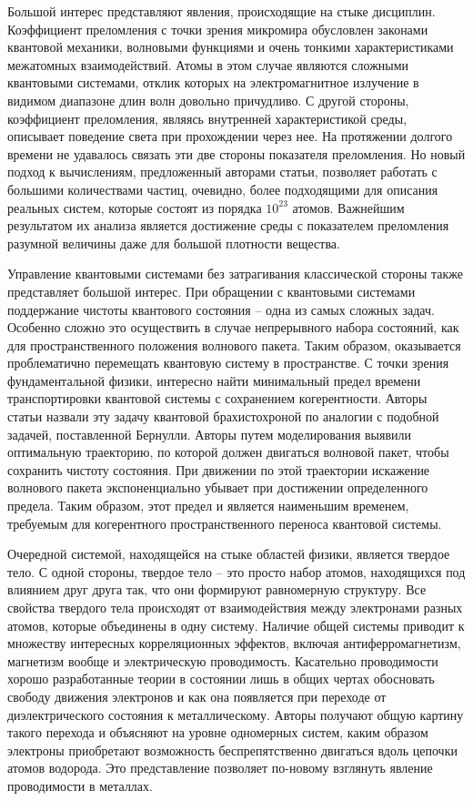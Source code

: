 \documentclass[a4paper, 14pt]{extarticle}
\begin{document}
Большой интерес представляют явления, происходящие на стыке дисциплин. 
Коэффициент преломления с точки зрения микромира обусловлен законами 
квантовой механики, волновыми функциями и очень тонкими характеристиками 
межатомных взаимодействий. Атомы в этом случае являются сложными 
квантовыми системами, отклик которых на электромагнитное излучение 
в видимом диапазоне длин волн довольно причудливо. С другой стороны, 
коэффициент преломления, являясь внутренней характеристикой среды, 
описывает поведение света при прохождении через нее. На протяжении 
долгого времени не удавалось связать эти две стороны показателя 
преломления. Но новый подход к вычислениям, предложенный авторами 
статьи, позволяет работать с большими количествами частиц, очевидно, 
более подходящими для описания реальных систем, которые состоят из 
порядка $10^{23}$ атомов. Важнейшим результатом их анализа является 
достижение среды с показателем преломления разумной величины даже для 
большой плотности вещества.

Управление квантовыми системами без затрагивания классической стороны 
также представляет большой интерес. При обращении с квантовыми системами 
поддержание чистоты квантового состояния -- одна из самых сложных задач. 
Особенно сложно это осуществить в случае непрерывного набора состояний, 
как для пространственного положения волнового пакета. Таким образом, 
оказывается проблематично перемещать квантовую систему в пространстве. 
С точки зрения фундаментальной физики, интересно найти минимальный 
предел времени транспортировки квантовой системы с сохранением 
когерентности. Авторы статьи назвали эту задачу квантовой брахистохроной 
по аналогии с подобной задачей, поставленной Бернулли. Авторы путем 
моделирования выявили оптимальную траекторию, по которой должен 
двигаться волновой пакет, чтобы сохранить чистоту состояния. При 
движении по этой траектории искажение волнового пакета экспоненциально 
убывает при достижении определенного предела. Таким образом, этот предел 
и является наименьшим временем, требуемым для когерентного 
пространственного переноса квантовой системы.

Очередной системой, находящейся на стыке областей физики, является 
твердое тело. С одной стороны, твердое тело -- это просто набор атомов, 
находящихся под влиянием друг друга так, что они формируют равномерную 
структуру. Все свойства твердого тела происходят от взаимодействия между 
электронами разных атомов, которые объединены в одну систему. Наличие 
общей системы приводит к множеству интересных корреляционных эффектов, 
включая антиферромагнетизм, магнетизм вообще и электрическую 
проводимость. Касательно проводимости хорошо разработанные теории 
в состоянии лишь в общих чертах обосновать свободу движения электронов 
и как она появляется при переходе от диэлектрического состояния 
к металлическому. Авторы получают общую картину такого перехода 
и объясняют на уровне одномерных систем, каким образом электроны 
приобретают возможность беспрепятственно двигаться вдоль цепочки атомов 
водорода. Это представление позволяет по-новому взглянуть явление 
проводимости в металлах.
\end{document}
